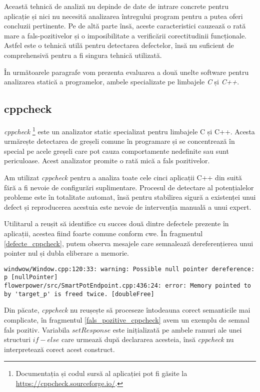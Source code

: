 Această tehnică de analiză nu depinde de date de intrare concrete pentru aplicație și nici nu necesită analizarea întregului program pentru a putea oferi concluzii pertinente. Pe de altă parte însă, aceste caracteristici cauzează o rată mare a fals-pozitivelor și o imposibilitate a verificării corectitudinii funcționale. Astfel este o tehnică utilă pentru detectarea defectelor, însă nu suficient de comprehensivă pentru a fi singura tehnică utilizată.

În următoarele paragrafe vom prezenta evaluarea a două unelte software pentru analizarea statică a programelor, ambele specializate pe limbajele \textit{C} și \textit{C++}.

\subsection{cppcheck}

\textit{cppcheck} \footnote{Documentația și codul sursă al aplicației pot fi găsite la \url{https://cppcheck.sourceforge.io/}.} este un analizator static specializat pentru limbajele C și C++. Acesta urmărește detectarea de greșeli comune în programare și se concentrează în special pe acele greșeli care pot cauza comportamente nedefinite sau sunt periculoase. Acest analizator promite o rată mică a fals pozitivelor.

Am utilizat \textit{cppcheck} pentru a analiza toate cele cinci aplicații C++ din suită fără a fi nevoie de configurări suplimentare. Procesul de detectare al potențialelor probleme este în totalitate automat, însă pentru stabilirea sigură a existenței unui defect și reproducerea acestuia este nevoie de intervenția manuală a unui expert.

Utilitarul a reușit să identifice cu succes două dintre defectele prezente în aplicații, acestea fiind foarte comune conform \acrfull{cwe}. În fragmentul \ref{defecte_cppcheck}, putem observa mesajele care semnalează dereferențierea unui pointer nul și dubla eliberare a memorie. 

\begin{lstlisting}[caption={Cele două defecte detectate de \textit{cppcheck}}, label={defecte_cppcheck}]
windwow/Window.cpp:120:33: warning: Possible null pointer dereference: p [nullPointer]
flowerpower/src/SmartPotEndpoint.cpp:436:24: error: Memory pointed to by 'target_p' is freed twice. [doubleFree]
\end{lstlisting}

Din păcate, \textit{cppcheck} nu reușește să proceseze întodeauna corect semanticile mai complicate, în fragmentul \ref{fals_pozitive_cppcheck} avem un exemplu de semnal fals pozitiv. Variabila $setResponse$ este inițializată pe ambele ramuri ale unei structuri $if - else$ care urmează după declararea acesteia, însă \textit{cppcheck} nu interpretează corect acest construct.

